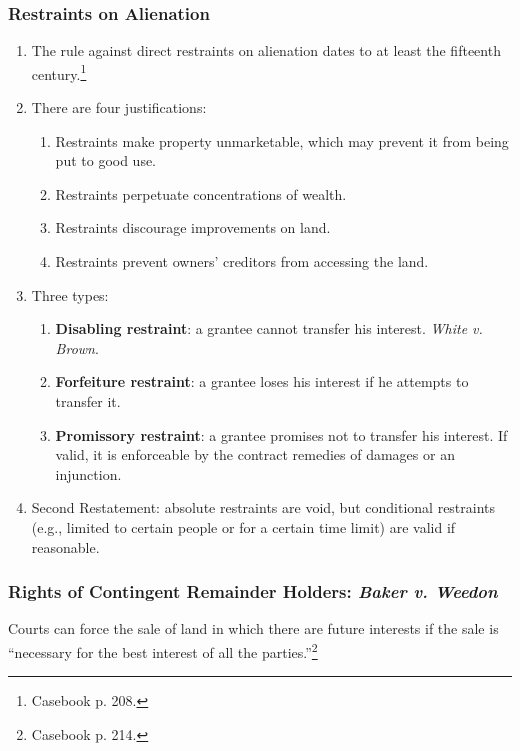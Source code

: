 \subsubsection{Restraints on Alienation}

\begin{enumerate}
    \item The rule against direct restraints on alienation dates to at least 
    the fifteenth century.\footnote{Casebook p. 208.}
    \item There are four justifications:
    \begin{enumerate}
        \item Restraints make property unmarketable, which may prevent it from 
        being put to good use.
        \item Restraints perpetuate concentrations of wealth.
        \item Restraints discourage improvements on land.
        \item Restraints prevent owners' creditors from accessing the land.
    \end{enumerate}
    \item Three types:
    \begin{enumerate}
        \item \textbf{Disabling restraint}: a grantee cannot transfer his 
        interest. \emph{White v. Brown}.
        \item \textbf{Forfeiture restraint}: a grantee loses his interest if 
        he attempts to transfer it.
        \item \textbf{Promissory restraint}: a grantee promises not to 
        transfer his interest. If valid, it is enforceable by the contract 
        remedies of damages or an injunction.
    \end{enumerate}
    \item Second Restatement: absolute restraints are void, but conditional 
    restraints (e.g., limited to certain people or for a certain time limit) 
    are valid if reasonable.
\end{enumerate}

\subsubsection{Rights of Contingent Remainder Holders: \emph{Baker v. Weedon}}

Courts can force the sale of land in which there are future interests if the 
sale is ``necessary for the best interest of all the 
parties.''\footnote{Casebook p. 214.}

